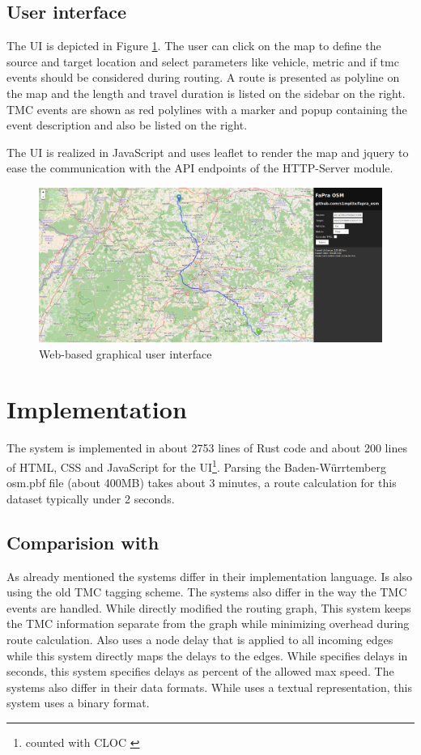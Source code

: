 \documentclass[a4paper]{scrartcl}
\begin{document}
\subsection{User interface}
The UI is depicted in Figure \ref{gui}. The user can click on the map to define the source and target location and select parameters like vehicle, metric and if tmc events should be considered during routing. A route is presented as polyline on the map and the length and travel duration is listed on the sidebar on the right. TMC events are shown as red polylines with a marker and popup containing the event description and also be listed 
on the right. 

The UI is realized in JavaScript and uses leaflet to render the map and jquery to ease the communication with the API endpoints of the HTTP-Server module. 

\begin{figure}[t]
\centering
\includegraphics[width=1.0\textwidth]{img/screenshot.png}
\caption{Web-based graphical user interface}
\label{gui}
\end{figure}


\section{Implementation}
\label{impl}
The system is implemented in about 2753 lines of Rust code and about 200 lines of HTML, CSS and JavaScript for the UI\footnote{counted with CLOC \cite{cloc}}. Parsing the Baden-Würrtemberg osm.pbf file (about 400MB) takes about 3 minutes, a route calculation for this dataset typically under 2 seconds. 

\subsection{Comparision with }
As already mentioned the systems differ in their implementation language. \citeauthor{sanwald2013} Is also using the old TMC tagging scheme. The systems also differ in the way the TMC events are handled. While \citeauthor{sanwald2013} directly modified the routing graph, This system keeps the TMC information separate from the graph while minimizing overhead during route calculation. Also \citeauthor{sanwald2013} uses a node delay that is applied to all incoming edges while this system directly maps the delays to the edges. While \citeauthor{sanwald2013} specifies delays in seconds, this system specifies delays as percent of the allowed max speed. The systems also differ in their data formats. While \citeauthor{sanwald2013} uses a textual representation, this system uses a binary format.
\end{document}
